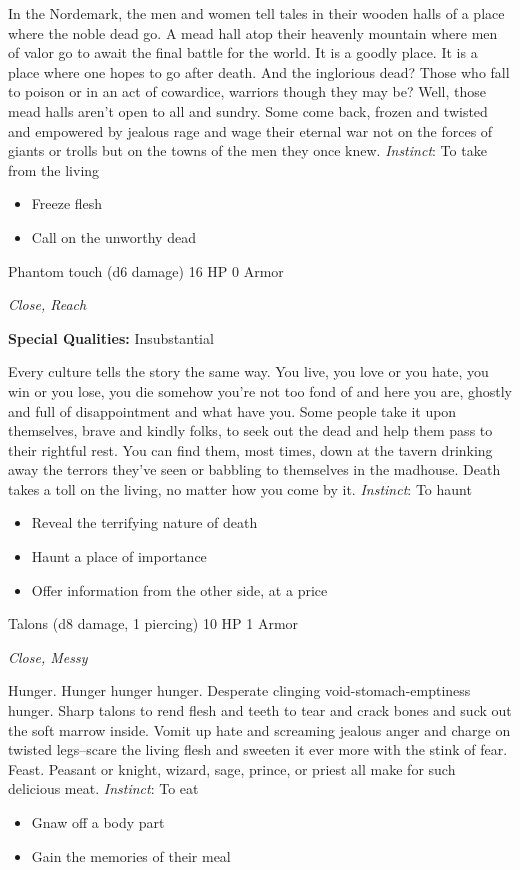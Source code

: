 \HRule
In the Nordemark, the men and women tell tales in their wooden halls of a place where the noble dead go. A mead hall atop their heavenly mountain where men of valor go to await the final battle for the world. It is a goodly place. It is a place where one hopes to go after death. And the inglorious dead? Those who fall to poison or in an act of cowardice, warriors though they may be? Well, those mead halls aren't open to all and sundry. Some come back, frozen and twisted and empowered by jealous rage and wage their eternal war not on the forces of giants or trolls but on the towns of the men they once knew. \emph{Instinct}: To take from the living
\begin{itemize}
\item Freeze flesh
\item Call on the unworthy dead
\end{itemize}

\HRule
{}

Phantom touch (d6 damage)\hspace*{\fill} 16 HP 0 Armor

\emph{Close, Reach}

\textbf{Special Qualities:}
Insubstantial

\HRule
Every culture tells the story the same way. You live, you love or you hate, you win or you lose, you die somehow you're not too fond of and here you are, ghostly and full of disappointment and what have you. Some people take it upon themselves, brave and kindly folks, to seek out the dead and help them pass to their rightful rest. You can find them, most times, down at the tavern drinking away the terrors they've seen or babbling to themselves in the madhouse. Death takes a toll on the living, no matter how you come by it. \emph{Instinct}: To haunt
\begin{itemize}
\item Reveal the terrifying nature of death
\item Haunt a place of importance
\item Offer information from the other side, at a price
\end{itemize}

\HRule
{}

Talons (d8 damage, 1 piercing)\hspace*{\fill} 10 HP 1 Armor

\emph{Close, Messy}

\HRule
Hunger. Hunger hunger hunger. Desperate clinging void-stomach-emptiness hunger. Sharp talons to rend flesh and teeth to tear and crack bones and suck out the soft marrow inside. Vomit up hate and screaming jealous anger and charge on twisted legs--scare the living flesh and sweeten it ever more with the stink of fear. Feast. Peasant or knight, wizard, sage, prince, or priest all make for such delicious meat. \emph{Instinct}: To eat
\begin{itemize}
\item Gnaw off a body part
\item Gain the memories of their meal
\end{itemize}

